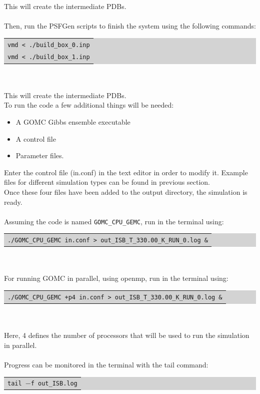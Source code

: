 This will create the intermediate PDBs.\\\\
Then, run the PSFGen scripts to finish the system using the following commands:\\
\colorbox{lightgray}{
\begin{tabular}{l}
\texttt{vmd < ./build\_box\_0.inp}\\
\texttt{vmd < ./build\_box\_1.inp}\\
\end{tabular}}\\\\
This will create the intermediate PDBs.\\
To run the code a few additional things will be needed:
\begin{itemize}
\item A GOMC Gibbs ensemble executable
\item A control file
\item Parameter files.
\end{itemize}
Enter the control file (in.conf) in the text editor in order to modify it. Example files for different simulation types can be found in previous section. \\
Once these four files have been added to the output directory, the simulation is ready.\\\\
Assuming the code is named \texttt{GOMC\_CPU\_GEMC}, run in the terminal using:\\
\colorbox{lightgray}{
\begin{tabular}{l}
\texttt{./GOMC\_CPU\_GEMC in.conf > out\_ISB\_T\_330.00\_K\_RUN\_0.log \&}
\end{tabular}}\\\\
For running GOMC in parallel, using openmp, run in the terminal using:\\
\colorbox{lightgray}{
\begin{tabular}{l}
\texttt{./GOMC\_CPU\_GEMC +p4 in.conf > out\_ISB\_T\_330.00\_K\_RUN\_0.log \&}
\end{tabular}}\\\\
Here, 4 defines the number of processors that will be used to run the simulation in parallel.\\\\
Progress can be monitored in the terminal with the tail command:\\
\colorbox{lightgray}{
\begin{tabular}{l}
\texttt{tail $-$f out\_ISB.log}
\end{tabular}}\\\\
